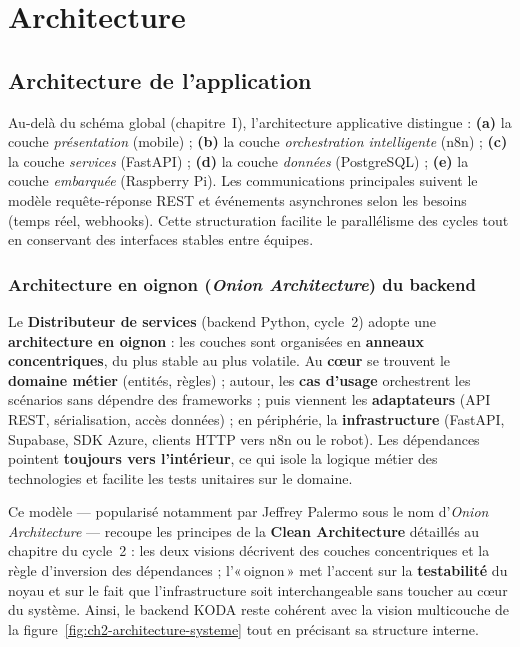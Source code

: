\documentclass[a4paper,12pt]{report}
\begin{document}
	\section{Architecture}
	
	\subsection{Architecture de l'application}
	
	Au-delà du schéma global (chapitre~I), l'architecture applicative distingue :
	\textbf{(a)} la couche \textit{présentation} (mobile) ; \textbf{(b)} la couche
	\textit{orchestration intelligente} (n8n) ; \textbf{(c)} la couche
	\textit{services} (FastAPI) ; \textbf{(d)} la couche \textit{données} (PostgreSQL) ;
	\textbf{(e)} la couche \textit{embarquée} (Raspberry Pi). Les communications
	principales suivent le modèle requête-réponse REST et événements asynchrones selon
	les besoins (temps réel, webhooks). Cette structuration facilite le parallélisme
	des cycles tout en conservant des interfaces stables entre équipes.
	
	\subsubsection{Architecture en oignon (\textit{Onion Architecture}) du backend}
	
	Le \textbf{Distributeur de services} (backend Python, cycle~2) adopte une
	\textbf{architecture en oignon} : les couches sont organisées en \textbf{anneaux
	concentriques}, du plus stable au plus volatile. Au \textbf{c\oe{}ur} se trouvent le
	\textbf{domaine métier} (entités, règles) ; autour, les \textbf{cas d'usage}
	orchestrent les scénarios sans dépendre des frameworks ; puis viennent les
	\textbf{adaptateurs} (API REST, sérialisation, accès données) ; en périphérie, la
	\textbf{infrastructure} (FastAPI, Supabase, SDK Azure, clients HTTP vers n8n ou le
	robot). Les dépendances pointent \textbf{toujours vers l'intérieur}, ce qui isole
	la logique métier des technologies et facilite les tests unitaires sur le domaine.
	
	Ce modèle — popularisé notamment par Jeffrey Palermo sous le nom d'\textit{Onion
	Architecture} — recoupe les principes de la \textbf{Clean Architecture} détaillés
	au chapitre du cycle~2 : les deux visions décrivent des couches concentriques et la
	règle d'inversion des dépendances ; l'«\,oignon\,» met l'accent sur la \textbf{testabilité}
	du noyau et sur le fait que l'infrastructure soit interchangeable sans toucher au
	c\oe{}ur du système. Ainsi, le backend KODA reste cohérent avec la vision multicouche
	de la figure~\ref{fig:ch2-architecture-systeme} tout en précisant sa structure interne.
	
\end{document}
